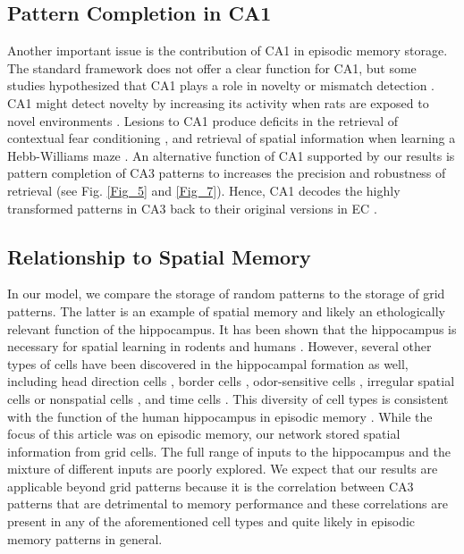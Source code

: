 \documentclass[utf8]{frontiersSCNS} %
\begin{document}
\subsection{Pattern Completion in CA1}
Another important issue is the contribution of CA1 in episodic memory storage. The standard framework does not offer a clear function for CA1, but some studies hypothesized that CA1 plays a role in novelty or mismatch detection \citep{hasselmo1996encoding, lisman2001storage}. CA1 might detect novelty by increasing its activity when rats are exposed to novel environments \citep{karlsson2008network, csicsvari2007place}.
%
Lesions to CA1 produce deficits in the retrieval of contextual fear conditioning \citep{lee2004differential}, and retrieval of spatial information when learning a Hebb-Williams maze \citep{jerman2006disconnection, vago2007role, hunsaker2008double}. 
%
An alternative function of CA1 supported by our results is pattern completion of CA3 patterns to increases the precision and robustness of retrieval (see Fig. \ref{Fig_5} and \ref{Fig_7}). Hence, CA1 decodes the highly transformed patterns in CA3 back to their original versions in EC \citep{neher2015memory}.


\subsection{Relationship to Spatial Memory}
In our model, we compare the storage of random patterns to the storage of grid patterns. The latter is an example of spatial memory and likely an ethologically relevant function of the hippocampus. It has been shown that the  hippocampus is necessary for spatial learning in rodents \citep{morris1982place} and humans \citep{burgess2002human}.  However, several other types of cells have been discovered in the hippocampal formation as well, including head direction cells \citep{taube1990head}, border cells \citep{solstad2008representation}, odor-sensitive cells \citep{deshmukh2003representation}, irregular spatial cells or nonspatial cells \citep{zhang2013optogenetic}, and time cells \citep{macdonald2011hippocampal, salz2016time}. This diversity of cell types is consistent with the function of the human hippocampus in episodic memory \citep{burgess2002human}. While the focus of this article was on episodic memory, our network stored spatial information from grid cells. The full range of inputs to the hippocampus and the mixture of different inputs are poorly explored. We expect that our results are applicable beyond grid patterns because it is the correlation between CA3 patterns that are detrimental to memory performance and these correlations are present in any of the aforementioned cell types and quite likely in episodic memory patterns in general.
\end{document}
